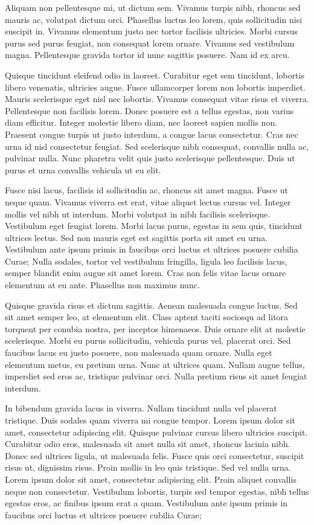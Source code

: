 \documentclass[11pt,english,]{memoir}
\begin{document}
Aliquam non pellentesque mi, ut dictum sem. Vivamus turpis nibh, rhoncus sed mauris ac, volutpat dictum orci. Phasellus luctus leo lorem, quis sollicitudin nisi suscipit in. Vivamus elementum justo nec tortor facilisis ultricies. Morbi cursus purus sed purus feugiat, non consequat lorem ornare. Vivamus sed vestibulum magna. Pellentesque gravida tortor id nunc sagittis posuere. Nam id ex arcu.

Quisque tincidunt eleifend odio in laoreet. Curabitur eget sem tincidunt, lobortis libero venenatis, ultricies augue. Fusce ullamcorper lorem non lobortis imperdiet. Mauris scelerisque eget nisl nec lobortis. Vivamus consequat vitae risus et viverra. Pellentesque non facilisis lorem. Donec posuere est a tellus egestas, non varius diam efficitur. Integer molestie libero diam, nec laoreet sapien mollis non. Praesent congue turpis ut justo interdum, a congue lacus consectetur. Cras nec urna id nisl consectetur feugiat. Sed scelerisque nibh consequat, convallis nulla ac, pulvinar nulla. Nunc pharetra velit quis justo scelerisque pellentesque. Duis ut purus et urna convallis vehicula ut eu elit.

Fusce nisi lacus, facilisis id sollicitudin ac, rhoncus sit amet magna. Fusce ut neque quam. Vivamus viverra est erat, vitae aliquet lectus cursus vel. Integer mollis vel nibh ut interdum. Morbi volutpat in nibh facilisis scelerisque. Vestibulum eget feugiat lorem. Morbi lacus purus, egestas in sem quis, tincidunt ultrices lectus. Sed non mauris eget est sagittis porta sit amet eu urna. Vestibulum ante ipsum primis in faucibus orci luctus et ultrices posuere cubilia Curae; Nulla sodales, tortor vel vestibulum fringilla, ligula leo facilisis lacus, semper blandit enim augue sit amet lorem. Cras non felis vitae lacus ornare elementum at eu ante. Phasellus non maximus nunc.

Quisque gravida risus et dictum sagittis. Aenean malesuada congue luctus. Sed sit amet semper leo, at elementum elit. Class aptent taciti sociosqu ad litora torquent per conubia nostra, per inceptos himenaeos. Duis ornare elit at molestie scelerisque. Morbi eu purus sollicitudin, vehicula purus vel, placerat orci. Sed faucibus lacus eu justo posuere, non malesuada quam ornare. Nulla eget elementum metus, eu pretium urna. Nunc at ultrices quam. Nullam augue tellus, imperdiet sed eros ac, tristique pulvinar orci. Nulla pretium risus sit amet feugiat interdum.

In bibendum gravida lacus in viverra. Nullam tincidunt nulla vel placerat tristique. Duis sodales quam viverra mi congue tempor. Lorem ipsum dolor sit amet, consectetur adipiscing elit. Quisque pulvinar cursus libero ultricies suscipit. Curabitur odio eros, malesuada sit amet nulla sit amet, rhoncus lacinia nibh. Donec sed ultrices ligula, ut malesuada felis. Fusce quis orci consectetur, suscipit risus ut, dignissim risus. Proin mollis in leo quis tristique. Sed vel nulla urna. Lorem ipsum dolor sit amet, consectetur adipiscing elit. Proin aliquet convallis neque non consectetur. Vestibulum lobortis, turpis sed tempor egestas, nibh tellus egestas eros, ac finibus ipsum erat a quam. Vestibulum ante ipsum primis in faucibus orci luctus et ultrices posuere cubilia Curae;
\end{document}
